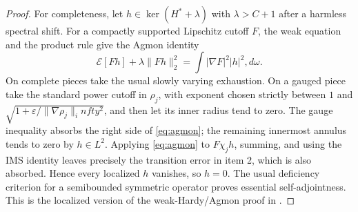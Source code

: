 \documentclass[11pt]{article}
\newcommand{\cE}{\mathcal E}
\begin{document}
\begin{proof}
For completeness, let $h\in\ker(H^*+\lambda)$ with $\lambda>C+1$ after a
harmless spectral shift.  For a compactly supported Lipschitz cutoff $F$,
the weak equation and the product rule give the Agmon identity
\begin{equation}\label{eq:agmon}
 \cE[Fh]+\lambda\|Fh\|_2^2
 =\int |\nabla F|^2|h|^2,d\omega.
\end{equation}
On complete pieces take the usual slowly varying exhaustion.  On a gauged
piece take the standard power cutoff in $\rho_j$, with exponent chosen
strictly between $1$ and
$\sqrt{1+\varepsilon/\|\nabla\rho_j\|_infty^2}$, and then let its inner
radius tend to zero.  The gauge inequality absorbs the right side of
\eqref{eq:agmon}; the remaining innermost annulus tends to zero by
$h\in L^2$.  Applying \eqref{eq:agmon} to $F\chi_jh$, summing, and using the
IMS identity leaves precisely the transition error in item 2, which is also
absorbed.  Hence every localized $h$ vanishes, so $h=0$.  The usual
deficiency criterion for a semibounded symmetric operator proves essential
self-adjointness.  This is the localized version of the weak-Hardy/Agmon
proof in \cite{PRS,FPR}.
\end{proof}
\end{document}

